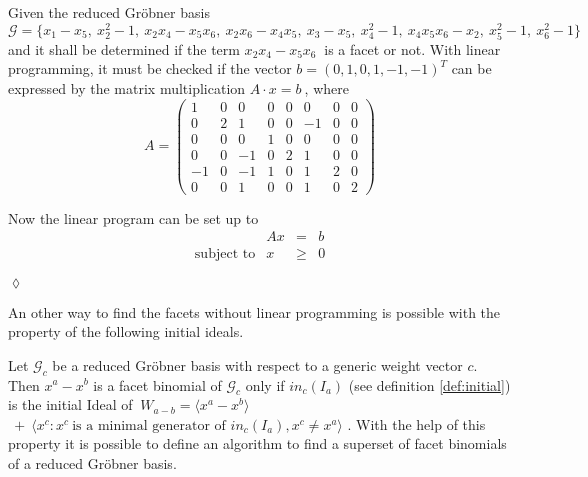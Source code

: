 \begin{env_example}\normalfont

Given the reduced Gröbner basis \\
 $\mathcal{G} = \{x_1 - x_5,~x_{2}^{2}-1,~x_{2}x_{4}-x_{5}x_{6},~x_{2}x_{6}-x_{4}x_{5},~x_{3}-x_{5},~x_{4}^{2}-1,~x_{4}x_{5}x_{6}-x_{2},~x_{5}^{2}-1,~x_{6}^{2}-1  \}~$ and it shall be determined if the term $x_{2}x_{4}-x_{5}x_{6}~$ is a facet or not.
 With linear programming, it must be checked if the vector $b = {\left(0,1,0,1,-1,-1\right)}^{T}$ can be expressed by the matrix multiplication $A \cdot x = b~$, where \\
 \[
 A =
 \begin{pmatrix}
 1  & 0 & 0  & 0 & 0 & 0  & 0 & 0\\ 
 0  & 2 & 1  & 0 & 0 & -1 & 0 & 0\\  
 0  & 0 & 0  & 1 & 0 & 0  & 0 & 0\\ 
 0  & 0 & -1 & 0 & 2 & 1  & 0 & 0\\
 -1 & 0 & -1 & 1 & 0 & 1  & 2 & 0\\
 0  & 0 & 1  & 0 & 0 & 1  & 0 & 2
 \end{pmatrix} 
 \] 
  
 Now the linear program can be set up to 
 \[
 	\begin{array}{lrcl}
 	\textrm{ }   & Ax    & =    & b   \\
 	\textrm{subject to}  & x     & \geq & 0
 			    
 	\end{array}
 \]
 

\begin{flushright}
$\lozenge$
\end{flushright}
\end{env_example}
\newpage 
An other way to find the facets without linear programming is possible with the property of the following initial ideals.

Let $\mathcal{G}_{c} $ be a reduced Gröbner basis with respect to a generic weight vector $c$. Then $x^{a} - x^{b}$ is a facet binomial of $\mathcal{G}_{c}$ only if $in_{c}(I_{a})$ (see definition \ref{def:initial}) is the initial Ideal of $~W_{a - b} = \langle x^{a}-x^{b}\rangle$
$~+~ \langle x^{c}  : x^{c}~\textrm{is a minimal generator of~} in_{c}(I_{a}), x^{c} \neq x^{a} \rangle$ \cite{tigers}.
With the help of this property it is possible to define an algorithm to find a superset of facet binomials of a reduced Gröbner basis.


